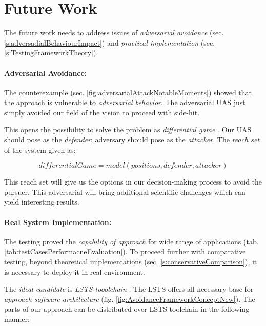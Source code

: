 \newpage
\section{Future Work}\label{s:futureWork}

\noindent The future work needs to address issues of \emph{adversarial avoidance} (sec. \ref{s:adversadialBehaviourImpact}) and \emph{practical implementation} (sec. \ref{s:TestingFrameworkTheory}).

\paragraph{Adversarial Avoidance:} The counterexample (sec. \ref{fig:adversarialAttackNotableMoments}) showed that the approach is vulnerable to \emph{adversarial behavior}. The adversarial UAS just simply avoided our field of the vision to proceed with side-hit.

This opens the possibility to solve the problem as \emph{differential game} \cite{game1987,game1988}. Our UAS should pose as the \emph{defender}; adversary should pose as the \emph{attacker}. The \emph{reach set} of the system given as:

\begin{equation*}
    differential Game = model(positions, defender, attacker)
\end{equation*}

\noindent This reach set  will give us the options in our decision-making process to avoid the pursuer. This adversarial will bring additional scientific challenges which can yield interesting results.

\paragraph{Real System Implementation:} The testing proved the \emph{capability of approach} for wide range of applications (tab. \ref{tab:testCasesPerformacneEvaluation}). To proceed further with comparative testing, beyond theoretical implementations (sec. \ref{s:conservativeComparison}), it is necessary to deploy it in real environment.

The \emph{ideal candidate} is \emph{LSTS-tooolchain} \cite{pinto2013lsts}. The LSTS offers all necessary base for \emph{approach software architecture} (fig. \ref{fig:AvoidanceFrameworkConceptNew}). The parts of our approach can be distributed over LSTS-toolchain in the following manner:


